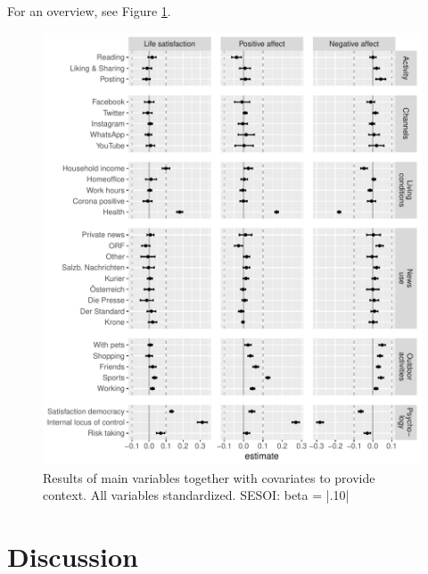 \documentclass[
  man,floatsintext]{apa7}
\begin{document}
For an overview, see Figure \ref{fig:fig-control}.

\begin{figure}
\includegraphics[width=\textwidth]{manuscript_files/figure-latex/fig-control-1} \caption{Results of main variables together with covariates to provide context. All variables standardized. SESOI: beta = |.10|}\label{fig:fig-control}
\end{figure}

\hypertarget{discussion}{%
\section{Discussion}\label{discussion}}
\end{document}
